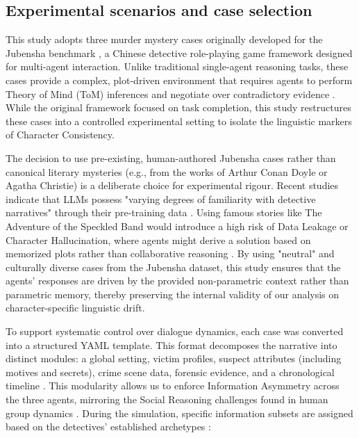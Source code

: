 \documentclass{article}
\begin{document}
\subsection{Experimental scenarios and case selection}

This study adopts three murder mystery cases originally developed for the Jubensha benchmark \citep{wu2024jubensha}, a Chinese detective role-playing game framework designed for multi-agent interaction. Unlike traditional single-agent reasoning tasks, these cases provide a complex, plot-driven environment that requires agents to perform Theory of Mind (ToM) inferences and negotiate over contradictory evidence \citep{zhu2024player, wu2024jubensha}. While the original framework focused on task completion, this study restructures these cases into a controlled experimental setting to isolate the linguistic markers of Character Consistency.

The decision to use pre-existing, human-authored Jubensha cases rather than canonical literary mysteries (e.g., from the works of Arthur Conan Doyle or Agatha Christie) is a deliberate choice for experimental rigour. Recent studies indicate that LLMs possess "varying degrees of familiarity with detective narratives" through their pre-training data \citep{delima2025detective}. Using famous stories like The Adventure of the Speckled Band would introduce a high risk of Data Leakage or Character Hallucination, where agents might derive a solution based on memorized plots rather than collaborative reasoning \citep{chen2023hp, chen2024review}. By using "neutral" and culturally diverse cases from the Jubensha dataset, this study ensures that the agents’ responses are driven by the provided non-parametric context rather than parametric memory, thereby preserving the internal validity of our analysis on character-specific linguistic drift.

To support systematic control over dialogue dynamics, each case was converted into a structured YAML template. This format decomposes the narrative into distinct modules: a global setting, victim profiles, suspect attributes (including motives and secrets), crime scene data, forensic evidence, and a chronological timeline \citep{wu2024jubensha, zhu2024player}. This modularity allows us to enforce Information Asymmetry across the three agents, mirroring the Social Reasoning challenges found in human group dynamics \citep{guo2026collab}. During the simulation, specific information subsets are assigned based on the detectives’ established archetypes \citep{delima2025detective}:
\end{document}
